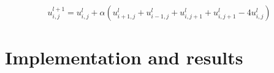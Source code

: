 \documentclass[10pt,a4paper]{article}
\begin{document}
\begin{equation}
u_{i,j}^{l+1} = u_{i,j}^l + \alpha\left( u_{i+1,j}^l + u_{i-1,j}^l + u_{i,j+1}^l + u_{i,j+1}^l - 4u_{i,j}^l \right)
\end{equation}



\section{Implementation and results}\label{sec:implementation_and_results}




{}
\end{document}
